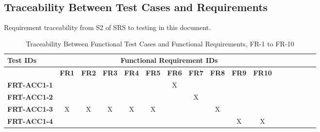 \documentclass[12pt, titlepage]{article}
\begin{document}
\begin{landscape}

		\subsection{Traceability Between Test Cases and Requirements}

		Requirement traceability from S2 of SRS to testing in this document.

		\begin{longtable}{|l|cccccccccccccccc|}
			\caption{Traceability Between Functional Test Cases and Functional Requirements, FR-1 to FR-10}                                                                                                                                                                                                                           \\
			\hline
			\textbf{Test IDs}   & \multicolumn{11}{c|}{\textbf{Functional Requirement IDs}}                                                                                                                                                                                                                                         \\
			\hline
			~                   & \textbf{FR1}                                              & \textbf{FR2} & \textbf{FR3} & \textbf{FR4} & \textbf{FR5} & \textbf{FR6} & \textbf{FR7} & \textbf{FR8} & \textbf{FR9} & \textbf{FR10}  \\
			\hline
			\textbf{FRT-ACC1-1}  & ~                                                         & ~            & ~            & ~            & ~            & X            & ~            & ~            & ~            & ~             \\
			\textbf{FRT-ACC1-2}  & ~                                                         & ~            & ~            & ~            & ~            & ~            & X            & ~            & ~            & ~             \\
			\textbf{FRT-ACC1-3}  & X                                                         & X            & X            & X            & X            & ~            & ~            & X            & ~            & ~             \\
			\textbf{FRT-ACC1-4}  & ~                                                         & ~            & ~            & ~            & ~            & ~            & ~            & ~            & X            & X             \\
			\hline
		\end{longtable}


\end{landscape}
\end{document}
